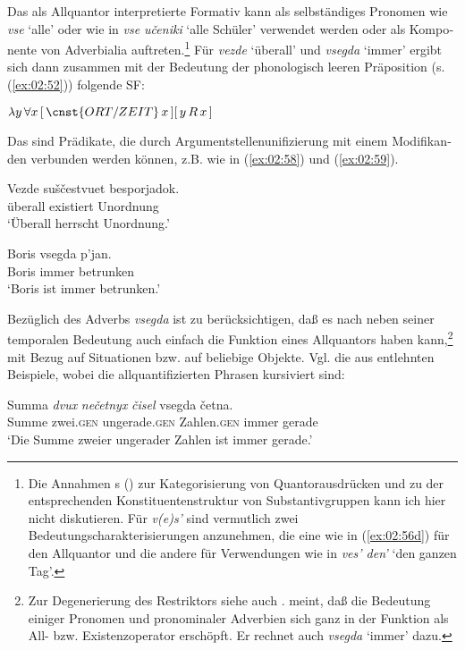 \documentclass[output=paper, colorlinks, citecolor=brown, booklanguage=german]{langscibook}
\begin{document}
\begin{otherlanguage}{german}
\noindent Das als Allquantor interpretierte Formativ kann als selbständiges Pronomen wie \textit{vse} `alle' oder wie in \textit{vse učeniki} `alle Schüler' verwendet werden oder als Komponente von Adverbialia auftreten.\footnote{Die Annahmen \citeauthor{Giusti1991}s (\citeyear{Giusti1991}) zur Kategorisierung von Quantorausdrücken und zu der entsprechenden Konstituentenstruktur von Substantivgruppen kann ich hier nicht diskutieren. Für \textit{v(e)s'} sind vermutlich zwei Bedeutungscharakterisierungen anzunehmen, die eine wie in (\ref{ex:02:56d}) für den Allquantor und die andere für Verwendungen wie in \textit{ves' den'} `den ganzen Tag'.} Für \textit{vezde} `überall' und \textit{vsegda} `immer' ergibt sich dann zusammen mit der Bedeutung der phonologisch leeren Präposition (s. (\ref{ex:02:52})) folgende SF:

\ea $\lambda y\, \forall x\, [\, \cnst{ORT/ZEIT}\, x\,] [\, y\, R\, x \,]$ 
\z 

\noindent Das sind Prädikate, die durch Argumentstellenunifizierung mit einem Modifikanden verbunden werden können, z.B. wie in (\ref{ex:02:58}) und (\ref{ex:02:59}).

\ea\label{ex:02:58}
    \gll Vezde suščestvuet besporjadok.\\
    überall existiert Unordnung\\
    \glt ‘Überall herrscht Unordnung.’
    
\z 

\ea\label{ex:02:59}
    \gll Boris  vsegda p'jan.\\
    Boris immer betrunken\\
    \glt ‘Boris ist immer betrunken.’
\z 

\noindent Bezüglich des Adverbs \textit{vsegda} ist zu berücksichtigen, daß es nach \citet[222ff.]{Paduceva1985} neben seiner temporalen Bedeutung auch einfach die Funktion eines Allquantors haben kann,\footnote{Zur Degenerierung des Restriktors siehe auch \citet[95ff.]{Acquaviva1995}. \citet[163]{Isacenko1965} meint, daß die Bedeutung einiger Pronomen und pronominaler Adverbien sich ganz in der Funktion als All- bzw. Existenzoperator erschöpft. Er rechnet auch \textit{vsegda} `immer' dazu.} mit Bezug auf Situationen bzw. auf beliebige Objekte. Vgl. die aus \citet[231]{Paduceva1985} entlehnten Beispiele, wobei die allquantifizierten Phrasen kursiviert sind:

\ea
    \gll Summa \textit{dvux} \textit{nečetnyx} \textit{čisel}  vsegda četna.\\
    Summe zwei.\textsc{gen} ungerade.\textsc{gen} Zahlen.\textsc{gen} immer gerade\\
    \glt ‘Die Summe zweier ungerader Zahlen ist immer gerade.’
\z 


\end{otherlanguage}
\end{document}
